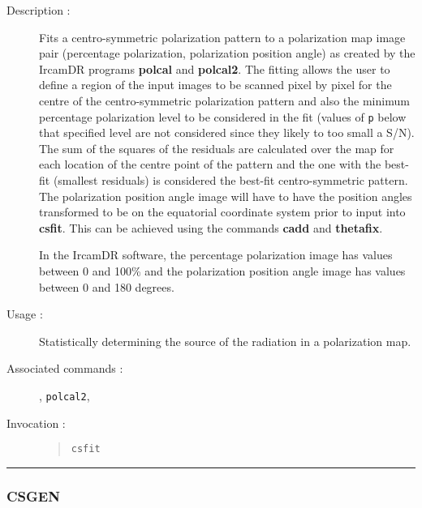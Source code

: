 \begin{description}

\item[Description :] Fits a centro-symmetric polarization pattern to a
polarization map image pair (percentage polarization, polarization
position angle) as created by the {\sc IrcamDR} programs {\bf polcal}
and {\bf polcal2}.  The fitting allows the user to define a region of
the input images to be scanned pixel by pixel for the centre of the
centro-symmetric polarization pattern and also the minimum percentage
polarization level to be considered in the fit (values of {\tt p} below
that specified level are not considered since they likely to too small
a S/N).  The sum of the squares of the residuals are calculated over
the map for each location of the centre point of the pattern and the
one with the best-fit (smallest residuals) is considered the best-fit
centro-symmetric pattern.  The polarization position angle image will
have to have the position angles transformed to be on the equatorial
coordinate system prior to input into {\bf csfit}.  This can be
achieved using the commands {\bf cadd} and {\bf thetafix}.

In the {\sc IrcamDR} software, the percentage polarization image has
values between 0 and 100\% and the polarization position angle image
has values between 0 and 180 degrees.


\item[Usage :] Statistically determining the source of the radiation in a
polarization map.

\item[Associated commands :] {\tt {}}, 
{\tt polcal2}, {\tt {}}

\item[Invocation :]

\begin{quote}{\tt  csfit }\end{quote}

\end{description}

\hrule 
\subsubsection*{\label{CSGEN}CSGEN}

